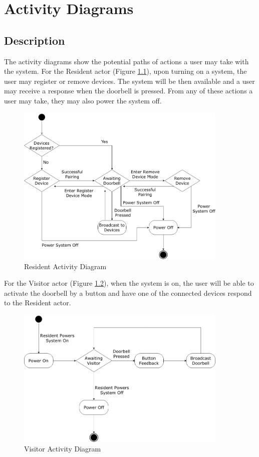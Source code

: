 \chapter{Activity Diagrams}

\section{Description}
The activity diagrams show the potential paths of actions a user may take with the system. For the Resident actor (Figure \ref{fig:residentdiagram}), upon turning on a system, the user may register or remove devices. The system will be then available and a user may receive a response when the doorbell is pressed. From any of these actions a user may take, they may also power the system off.

\begin{figure}[h]
  \includegraphics[width=0.9\textwidth]{ResidentActivityDiagram.png}
  \centering
  \caption{Resident Activity Diagram}
  \label{fig:residentdiagram}
\end{figure}

For the Visitor actor (Figure \ref{fig:visitordiagram}), when the system is on, the user will be able to activate the doorbell by a button and have one of the connected devices respond to the Resident actor.

\begin{figure}[h]
  \includegraphics[width=0.9\textwidth]{VisitorActivityDiagram.png}
  \centering
  \caption{Visitor Activity Diagram}
  \label{fig:visitordiagram}
\end{figure}